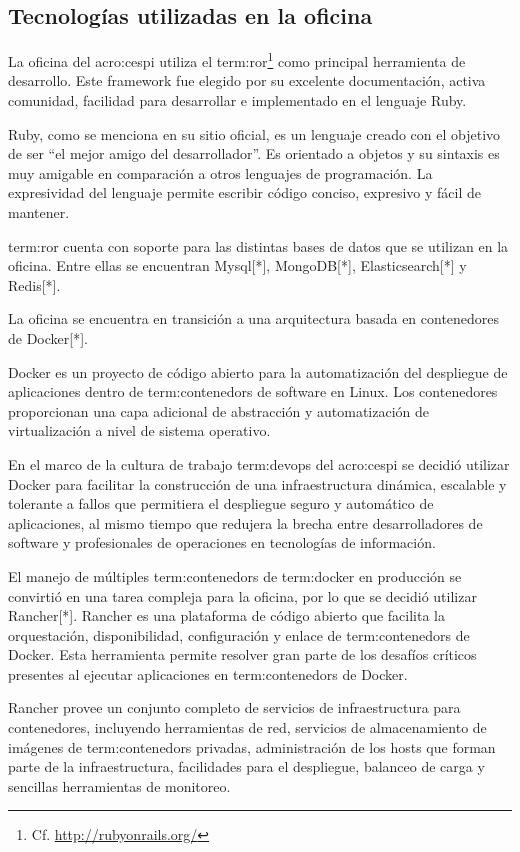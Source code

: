 \subsection{Tecnologías utilizadas en la oficina}
\label{tecnologias_utilizadas}

La oficina del \gls{acro:cespi} utiliza el  
\gls{term:ror}\footnote{Cf.  \url{http://rubyonrails.org/}} como principal herramienta
de desarrollo. Este framework fue elegido por su excelente documentación,
activa comunidad, facilidad para desarrollar e implementado en el lenguaje
Ruby.

Ruby, como se menciona en su sitio oficial, es un lenguaje creado con el
objetivo de ser “el mejor amigo del desarrollador”. Es orientado a objetos y su
sintaxis es muy amigable en comparación a otros lenguajes de programación. La
expresividad del lenguaje permite escribir código conciso, expresivo y fácil de
mantener.

\gls{term:ror} cuenta con soporte para las distintas bases de datos que se
utilizan en la oficina. Entre ellas se encuentran Mysql[*], MongoDB[*],
Elasticsearch[*] y Redis[*].

La oficina se encuentra en transición a una arquitectura basada en contenedores
de Docker[*].

Docker es un proyecto de código abierto para la automatización del despliegue
de aplicaciones dentro de \glspl{term:contenedor} de software en Linux. Los contenedores
proporcionan una capa adicional de abstracción y automatización de
virtualización a nivel de sistema operativo.

En el marco de la cultura de trabajo \gls{term:devops} del \gls{acro:cespi} se decidió utilizar
Docker para facilitar la construcción de una infraestructura dinámica,
escalable y tolerante a fallos que permitiera el despliegue seguro y automático
de aplicaciones, al mismo tiempo que redujera la brecha entre desarrolladores
de software y profesionales de operaciones en tecnologías de información.

El manejo de múltiples \glspl{term:contenedor} de \gls{term:docker} en producción se convirtió en una
tarea compleja para la oficina, por lo que se decidió utilizar Rancher[*].
Rancher es una plataforma de código abierto que facilita la orquestación,
disponibilidad, configuración y enlace de \glspl{term:contenedor} de Docker. Esta
herramienta permite resolver gran parte de los desafíos críticos presentes al
ejecutar aplicaciones en \glspl{term:contenedor} de Docker.

Rancher provee un conjunto completo de servicios de infraestructura para
contenedores, incluyendo herramientas de red, servicios de almacenamiento de
imágenes de \glspl{term:contenedor} privadas, administración de los hosts que forman parte
de la infraestructura, facilidades para el despliegue, balanceo de carga y
sencillas herramientas de monitoreo.
